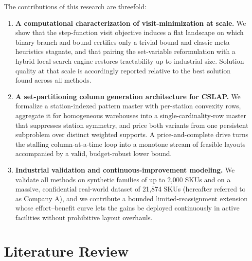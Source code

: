\documentclass[preprint,review,11pt,authoryear]{elsarticle}
\begin{document}
The contributions of this research are threefold:
\begin{enumerate}
    \item \textbf{A computational characterization of visit-minimization at scale.} We show that the step-function visit objective induces a flat landscape on which binary branch-and-bound certifies only a trivial bound and classic meta-heuristics stagnate, and that pairing the set-variable reformulation with a hybrid local-search engine restores tractability up to industrial size. Solution quality at that scale is accordingly reported relative to the best solution found across all methods.
    \item \textbf{A set-partitioning column generation architecture for CSLAP.} We formalize a station-indexed pattern master with per-station convexity rows, aggregate it for homogeneous warehouses into a single-cardinality-row master that suppresses station symmetry, and price both variants from one persistent subproblem over distinct weighted supports. A price-and-complete drive turns the stalling column-at-a-time loop into a monotone stream of feasible layouts accompanied by a valid, budget-robust lower bound.
    \item \textbf{Industrial validation and continuous-improvement modeling.} We validate all methods on synthetic families of up to 2,000 SKUs and on a massive, confidential real-world dataset of 21,874 SKUs (hereafter referred to as Company A), and we contribute a bounded limited-reassignment extension whose effort--benefit curve lets the gains be deployed continuously in active facilities without prohibitive layout overhauls.
\end{enumerate}






\section{Literature Review}\label{sec:lit_review}
\end{document}
